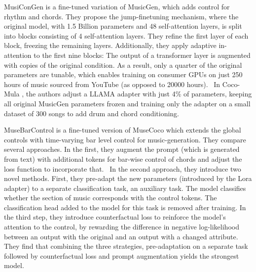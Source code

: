 MusiConGen \cite{Lan_Hsiao_Cheng_Yang_musicongen_2024} is a fine-tuned variation of MusicGen, which adds control for rhythm and chords. They propose the jump-finetuning mechanism, where the original model, with 1.5 Billion parameters and 48 self-attention layers, is split into blocks consisting of 4 self-attention layers. They refine the first layer of each block, freezing the remaining layers. Additionally, they apply adaptive in-attention to the first nine blocks: The output of a transformer layer is augmented with copies of the original condition. As a result, only a quarter of the original parameters are tunable, which enables training on consumer GPUs on just 250 hours of music sourced from YouTube (as opposed to 20000 hours).  In Coco-Mula \cite{Lin_cocomulla_2024}, the authors adjust a LLAMA adapter with just 4\% of parameters, keeping all original MusicGen parameters frozen and training only the adapter on a small dataset of 300 songs to add drum and chord conditioning. 

MuseBarControl \cite{Shu_Xu_Musebarcontrol_2024} is a fine-tuned version of MuseCoco \cite{Lu_Xu_Kang_Yu_Xing_Tan_Bian_MuseCoco_2023} which extends the global controls with time-varying bar level control for music-generation. They compare several approaches. In the first, they augment the prompt (which is generated from text) with additional tokens for bar-wise control of chords and adjust the loss function to incorporate that.  In the second approach, they introduce two novel methods. First, they pre-adapt the new parameters (introduced by the Lora adapter) to a separate classification task, an auxiliary task. The model classifies whether the section of music corresponds with the control tokens. The classification head added to the model for this task is removed after training. In the third step, they introduce counterfactual loss to reinforce the model's attention to the control, by rewarding the difference in negative log-likelihood between an output with the original and an output with a changed attribute. They find that combining the three strategies, pre-adaptation on a separate task followed by counterfactual loss and prompt augmentation yields the strongest model. 


